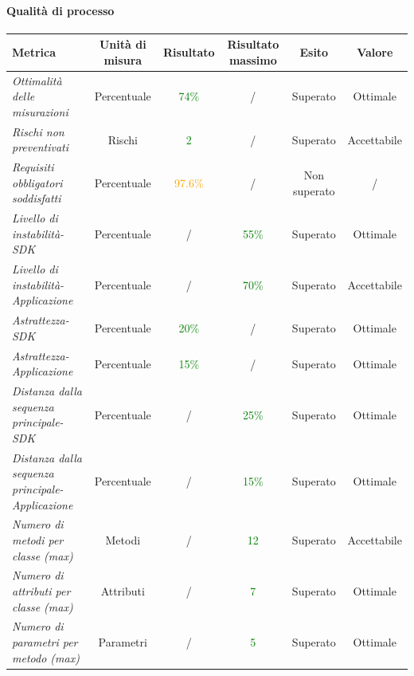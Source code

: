 \paragraph{Qualità di processo}
\begin{longtable}{|>{\centering}m{5cm}|c|c|c|c|c|}
\hline
\textbf{Metrica} & \textbf{Unità di misura} & \textbf{Risultato} & \textbf{Risultato massimo} & \textbf{Esito} & \textbf{Valore}\\
\hline
\endhead
\emph{Ottimalità delle misurazioni} & {Percentuale} & \textcolor{Green}{74\%} & / & Superato & Ottimale \\ \hline
\emph{Rischi non preventivati} & {Rischi} & \textcolor{Green}{2} & / & Superato & Accettabile\\ \hline
\emph{Requisiti obbligatori soddisfatti} & {Percentuale} & \textcolor{Orange}{97.6\%} & / & Non superato & /\\ \hline
\emph{Livello di instabilità-SDK} & {Percentuale} & / & \textcolor{Green}{55\%} & Superato & Ottimale\\ \hline
\emph{Livello di instabilità-Applicazione} & {Percentuale} & / & \textcolor{Green}{70\%} & Superato & Accettabile\\ \hline
\emph{Astrattezza-SDK} & {Percentuale} & \textcolor{Green}{20\%} & / & Superato & Ottimale\\ \hline
\emph{Astrattezza-Applicazione} & {Percentuale} &\textcolor{Green}{15\%} & / & Superato & Ottimale\\ \hline
\emph{Distanza dalla sequenza principale-SDK} & {Percentuale} & / & \textcolor{Green}{25\%} & Superato & Ottimale\\ \hline
\emph{Distanza dalla sequenza principale-Applicazione} & {Percentuale} & / & \textcolor{Green}{15\%} & Superato & Ottimale\\ \hline
\emph{Numero di metodi per classe (max)} & {Metodi} & / & \textcolor{Green}{12} & Superato & Accettabile\\ \hline
\emph{Numero di attributi per classe (max)} & {Attributi} & / & \textcolor{Green}{7} & Superato & Ottimale\\ \hline
\emph{Numero di parametri per metodo (max)} & {Parametri} & / & \textcolor{Green}{5} & Superato & Ottimale\\ \hline

\end{longtable}
